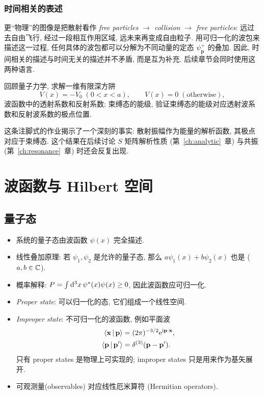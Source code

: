 \subsubsection{时间相关的表述}

更``物理''的图像是把散射看作 \emph{free particles $\to$ collision $\to$ free particles}: 远过去自由飞行, 经过一段相互作用区域, 远未来再变成自由粒子. 用可归一化的波包来描述这一过程, 任何具体的波包都可以分解为不同动量的定态 $\psi^{+}_{\mathbf p}$ 的叠加. 因此, 时间相关的描述与时间无关的描述并不矛盾, 而是互为补充. 后续章节会同时使用这两种语言.

\begin{remark}[作业 0]
回顾量子力学, 求解一维有限深方阱
\[V(x)=-V_{0}\;(0<x<a),\qquad V(x)=0\;(\text{otherwise}),\]
波函数中的透射系数和反射系数; 束缚态的能级, 验证束缚态的能级对应透射波系数和反射波系数的极点位置.
\end{remark}

这条注脚式的作业揭示了一个深刻的事实: 散射振幅作为能量的解析函数, 其极点对应于束缚态. 这个结果在后续讨论 $S$ 矩阵解析性质 (第~\ref{ch:analytic}~章) 与共振 (第~\ref{ch:resonance}~章) 时还会反复出现.

\section{波函数与 Hilbert 空间}\label{sec:wf-hilbert}

\subsection{量子态}

\begin{itemize}
    \item 系统的量子态由波函数 $\psi(x)$ 完全描述.
    \item 线性叠加原理: 若 $\psi_1,\psi_2$ 是允许的量子态, 那么 $a\psi_1(x)+b\psi_2(x)$ 也是 ($a,b\in\mathbb{C}$).
    \item 概率解释: $P=\int \mathrm{d}^{3}x\,\psi^{*}(x)\psi(x)\geq 0$, 因此波函数应可归一化.
    \item \emph{Proper state}: 可以归一化的态, 它们组成一个线性空间.
    \item \emph{Improper state}: 不可归一化的波函数, 例如平面波
    \begin{align}
        \left\langle \mathbf x \,\middle|\, \mathbf p \right\rangle&=(2\pi)^{-3/2}\mathrm{e}^{\mathrm{i}\mathbf p\cdot\mathbf x},\label{eq:plane-wave-x}\\
        \left\langle \mathbf p \,\middle|\, \mathbf p' \right\rangle&=\delta^{(3)}(\mathbf p-\mathbf p').\label{eq:p-orthogonality}
    \end{align}
    只有 proper states 是物理上可实现的; improper states 只是用来作为基矢展开.
    \item 可观测量(observables) 对应线性厄米算符 (Hermitian operators).
\end{itemize}

